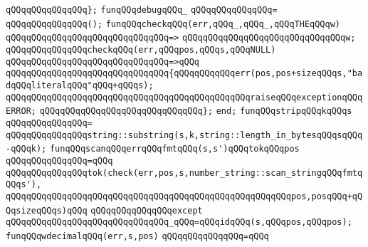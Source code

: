 \verb|qQQqqQQqqQQqqQQq};|\newline
\newline
\verb|funqQQqdebugqQQq_|\newline
\verb|qQQqqQQqqQQqqQQq=|\newline
\verb|qQQqqQQqqQQqqQQq();|\newline
\newline
\verb|funqQQqcheckqQQq(err,qQQq_,qQQq_,qQQqTHEqQQqw)|\newline
\verb|qQQqqQQqqQQqqQQqqQQqqQQqqQQqqQQq=>|\newline
\verb|qQQqqQQqqQQqqQQqqQQqqQQqqQQqqQQqw;|\newline
\newline
\verb|qQQqqQQqqQQqqQQqcheckqQQq(err,qQQqpos,qQQqs,qQQqNULL)|\newline
\verb|qQQqqQQqqQQqqQQqqQQqqQQqqQQqqQQq=>qQQq|\newline
\verb|qQQqqQQqqQQqqQQqqQQqqQQqqQQqqQQq{qQQqqQQqqQQqerr(pos,pos+sizeqQQqs,"badqQQqliteralqQQq"qQQq+qQQqs);|\newline
\verb|qQQqqQQqqQQqqQQqqQQqqQQqqQQqqQQqqQQqqQQqqQQqqQQqraiseqQQqexceptionqQQqERROR;|\newline
\verb|qQQqqQQqqQQqqQQqqQQqqQQqqQQqqQQq};|\newline
\verb|end;|\newline
\newline
\verb|funqQQqstripqQQqkqQQqs|\newline
\verb|qQQqqQQqqQQqqQQq=|\newline
\verb|qQQqqQQqqQQqqQQqstring::substring(s,k,string::length_in_bytesqQQqsqQQq-qQQqk);|\newline
\newline
\verb|funqQQqscanqQQqerrqQQqfmtqQQq(s,s')qQQqtokqQQqpos|\newline
\verb|qQQqqQQqqQQqqQQq=qQQq|\newline
\verb|qQQqqQQqqQQqqQQqtok(check(err,pos,s,number_string::scan_stringqQQqfmtqQQqs'),|\newline
\verb|qQQqqQQqqQQqqQQqqQQqqQQqqQQqqQQqqQQqqQQqqQQqqQQqqQQqqQQqpos,posqQQq+qQQqsizeqQQqs)qQQq|\newline
\verb|qQQqqQQqqQQqqQQqexcept|\newline
\verb|qQQqqQQqqQQqqQQqqQQqqQQqqQQqqQQq_qQQq=qQQqidqQQq(s,qQQqpos,qQQqpos);|\newline
\newline
\verb|funqQQqwdecimalqQQq(err,s,pos)|\newline
\verb|qQQqqQQqqQQqqQQq=qQQq|\newline
